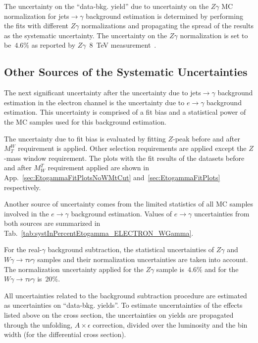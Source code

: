 The uncertainty on the ``data-bkg. yield'' due to uncertainty on the $Z\gamma$ MC normalization for jets$\rightarrow\gamma$ background estimation is determined by performing the fits with different $Z\gamma$ normalizations and propagating the spread of the results as the systematic uncertainty. The uncertainty on the $Z\gamma$ normalization is set to be~$4.6\%$ as reported by $Z\gamma$~$8$~TeV measurement~\cite{ref_Zg8TeV}.

\subsection{Other Sources of the Systematic Uncertainties}
\label{sec:Systematics_OtherSources}

The next significant uncertainty after the uncertainty due to jets$\rightarrow\gamma$ background estimation in the electron channel is the uncertainty due to $e\rightarrow\gamma$ background estimation. This uncertainty is comprised of a fit bias and a statistical power of the MC samples used for this background estimation. 

The uncertainty due to fit bias is evaluated by fitting $Z$-peak before and after $M_T^W$ requirement is applied. Other selection requirements are applied except the $Z$-mass window requirement. The plots with the fit results of the datasets before and after $M_W^T$ requirement applied are shown in App.~\ref{sec:EtogammaFitPlotsNoWMtCut} and~\ref{sec:EtogammaFitPlots} respectively.

Another source of uncertainty comes from the limited statistics of all MC samples involved in the $e\rightarrow\gamma$ background estimation. Values of $e\rightarrow\gamma$ uncertainties from both sources are summarized in Tab.~\ref{tab:systInPercentEtogamma_ELECTRON_WGamma}.


For the real-$\gamma$ background subtraction, the statistical uncertainties of $Z\gamma$ and $W\gamma\rightarrow\tau\nu\gamma$ samples and their normalization uncertainties are taken into account. The normalization uncertainty applied for the $Z\gamma$ sample is~$4.6\%$ and for the $W\gamma\rightarrow\tau\nu\gamma$ is~$20\%$.

All uncertainties related to the background subtraction procedure are estimated as uncertainties on ``data-bkg. yields''. To estimate uncerntainties of the effects listed above on the cross section, the uncertainties on yields are propagated through the unfolding, $A \times \epsilon$ correction, divided over the luminosity and the bin width (for the differential cross section).

